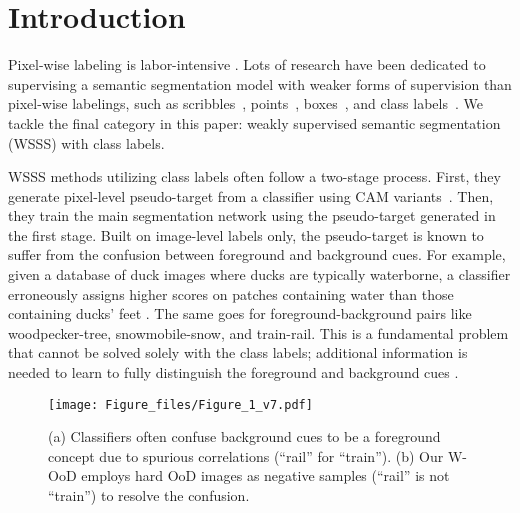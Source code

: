 \documentclass[10pt,twocolumn,letterpaper]{article}
\begin{document}
\section{Introduction}
\label{sec:intro}
Pixel-wise labeling is labor-intensive \cite{cordts2016cityscapes}. Lots of research have been dedicated to supervising a semantic segmentation model with weaker forms of supervision than pixel-wise labelings, such as scribbles~\cite{tang2018normalized}, points~\cite{bearman2016s, kim2021beyond}, boxes~\cite{khoreva2017simple,song2019box, lee2021bbam}, and class labels~\cite{wang2020self, lee2021anti, lee2021reducing, lee2018robust}. 
We tackle the final category in this paper: weakly supervised semantic segmentation (WSSS) with class labels. 


WSSS methods utilizing class labels often follow a two-stage process. First, they generate pixel-level pseudo-target from a classifier using CAM variants~\cite{zhou2016learning,selvaraju2017grad}. Then, they train the main segmentation network using the pseudo-target generated in the first stage. 
Built on image-level labels only, the pseudo-target is known to suffer from the confusion between foreground and background cues. For example, given a database of duck images where ducks are typically waterborne, a classifier erroneously assigns higher scores on patches containing water than those containing ducks' feet \cite{choe2020evaluating,li2019guided, zhang2020causal, lee2021reducing, lee2021railroad, kolesnikov2016improving}. The same goes for foreground-background pairs like woodpecker-tree, snowmobile-snow, and train-rail. This is a fundamental problem that cannot be solved solely with the class labels; additional information is needed to learn to fully distinguish the foreground and background cues \cite{choe2020evaluating, li2019guided, lee2021railroad}.


\begin{figure}[t]
\centering
\texttt{[image: Figure\_files/Figure\_1\_v7.pdf]}
\vspace{-2em}
\caption{\label{fig1} (a) Classifiers often confuse background cues to be a foreground concept due to spurious correlations (\eg ``rail'' for ``train''). (b) Our W-OoD employs hard OoD images as negative samples (\eg ``rail'' is not ``train'') to resolve the confusion.}
\vspace{-1.3em}
\end{figure}
 
\end{document}
